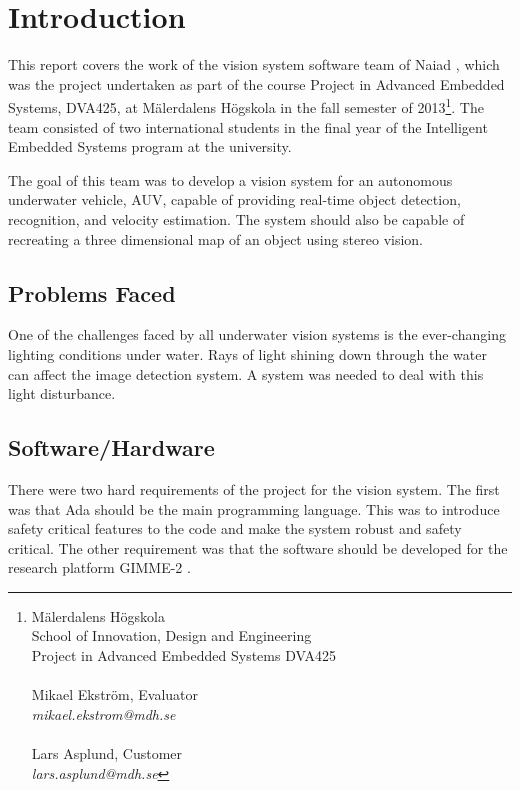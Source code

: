 \section{Introduction}\label{sec:introduction}
This report covers the work of the vision system software team of Naiad \cite{web:naiad}, which was the project undertaken as part of the course Project in Advanced Embedded Systems, DVA425, at M\"{a}lerdalens H\"{o}gskola in the fall semester of 2013\footnote{M\"{a}lerdalens H\"{o}gskola \\School of Innovation, Design and Engineering\\Project in Advanced Embedded Systems DVA425\\ \\Mikael Ekstr\"{o}m, Evaluator \\ \textit{mikael.ekstrom@mdh.se}\\ \\Lars Asplund, Customer\\ \textit{lars.asplund@mdh.se}}. The team consisted of two international students in the final year of the Intelligent Embedded Systems program at the university.

The goal of this team was to develop a vision system for an autonomous underwater vehicle, AUV, capable of providing real-time object detection, recognition, and velocity estimation. The system should also be capable of recreating a three dimensional map of an object using stereo vision.

\subsection{Problems Faced}
One of the challenges faced by all underwater vision systems is the ever-changing lighting conditions under water. Rays of light shining down through the water can affect the image detection system. A system was needed to deal with this light disturbance.

\subsection{Software/Hardware}
There were two hard requirements of the project for the vision system. The first was that Ada should be the main programming language. This was to introduce safety critical features to the code and make the system robust and safety critical. The other requirement was that the software should be developed for the research platform GIMME-2 \cite{web:GIMME2}. 

